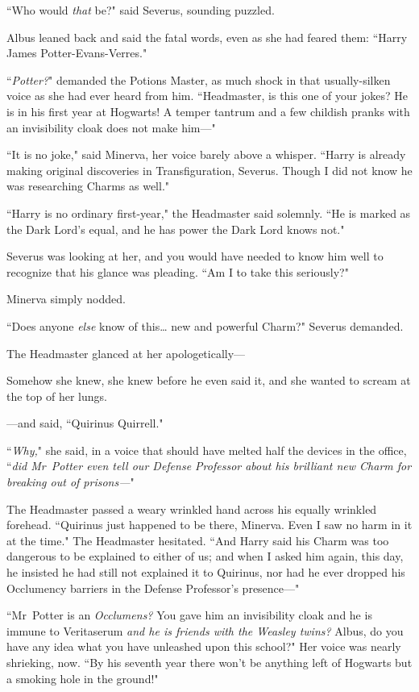 ``Who would \emph{that} be?" said Severus, sounding puzzled.

Albus leaned back and said the fatal words, even as she had feared them: ``Harry James Potter-Evans-Verres."

``\emph{Potter?}" demanded the Potions Master, as much shock in that usually-silken voice as she had ever heard from him. ``Headmaster, is this one of your jokes? He is in his first year at Hogwarts! A temper tantrum and a few childish pranks with an invisibility cloak does not make him—"

``It is no joke," said Minerva, her voice barely above a whisper. ``Harry is already making original discoveries in Transfiguration, Severus. Though I did not know he was researching Charms as well."

``Harry is no ordinary first-year," the Headmaster said solemnly. ``He is marked as the Dark Lord's equal, and he has power the Dark Lord knows not."

Severus was looking at her, and you would have needed to know him well to recognize that his glance was pleading. ``Am I to take this seriously?"

Minerva simply nodded.

``Does anyone \emph{else} know of this{\ldots} new and powerful Charm?" Severus demanded.

The Headmaster glanced at her apologetically—

Somehow she knew, she knew before he even said it, and she wanted to scream at the top of her lungs.

—and said, ``Quirinus Quirrell."

``\emph{Why,}" she said, in a voice that should have melted half the devices in the office, ``\emph{did Mr~Potter even \emph{tell} our Defense Professor about his brilliant new Charm for breaking out of prisons—}"

The Headmaster passed a weary wrinkled hand across his equally wrinkled forehead. ``Quirinus just happened to be there, Minerva. Even I saw no harm in it at the time." The Headmaster hesitated. ``And Harry said his Charm was too dangerous to be explained to either of us; and when I asked him again, this day, he insisted he had still not explained it to Quirinus, nor had he ever dropped his Occlumency barriers in the Defense Professor's presence—"

``Mr~Potter is an \emph{Occlumens?} You gave him an invisibility cloak and he is immune to Veritaserum \emph{and he is friends with the Weasley twins?} Albus, do you have any idea what you have unleashed upon this school?" Her voice was nearly shrieking, now. ``By his seventh year there won't be anything left of Hogwarts but a smoking hole in the ground!"

